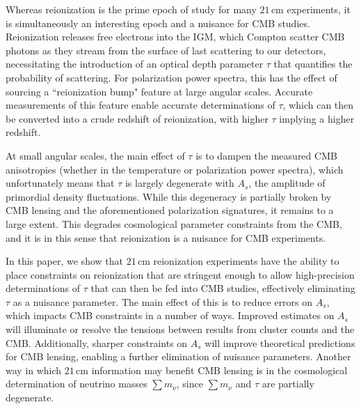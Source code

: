 \documentclass[twocolumn,aps,prd,nofootinbib,showpacs,superscriptaddress]{revtex4-1}
\begin{document}
Whereas reionization is the prime epoch of study for many $21\,\textrm{cm}$ experiments, it is simultaneously an interesting epoch and a nuisance for CMB studies. Reionization releases free electrons into the IGM, which Compton scatter CMB photons as they stream from the surface of last scattering to our detectors, necessitating the introduction of an optical depth parameter $\tau$ that quantifies the probability of scattering. For polarization power spectra, this has the effect of sourcing a ``reionization bump" feature at large angular scales. Accurate measurements of this feature enable accurate determinations of $\tau$, which can then be converted into a crude redshift of reionization, with higher $\tau$ implying a higher redshift.

At small angular scales, the main effect of $\tau$ is to dampen the measured CMB anisotropies (whether in the temperature or polarization power spectra), which unfortunately means that $\tau$ is largely degenerate with $A_s$, the amplitude of primordial density fluctuations. While this degeneracy is partially broken by CMB lensing and the aforementioned polarization signatures, it remains to a large extent. This degrades cosmological parameter constraints from the CMB, and it is in this sense that reionization is a nuisance for CMB experiments.

In this paper, we show that $21\,\textrm{cm}$ reionization experiments have the ability to place constraints on reionization that are stringent enough to allow high-precision determinations of $\tau$ that can then be fed into CMB studies, effectively eliminating $\tau$ as a nuisance parameter. The main effect of this is to reduce errors on $A_s$, which impacts CMB constraints in a number of ways. Improved estimates on $A_s$ will illuminate or resolve the tensions between results from cluster counts and the CMB. Additionally, sharper constraints on $A_s$ will improve theoretical predictions for CMB lensing, enabling a further elimination of nuisance parameters. Another way in which $21\,\textrm{cm}$ information may benefit CMB lensing is in the cosmological determination of neutrino masses $\sum m_\nu$, since $\sum m_\nu$ and $\tau$ are partially degenerate.
\end{document}
